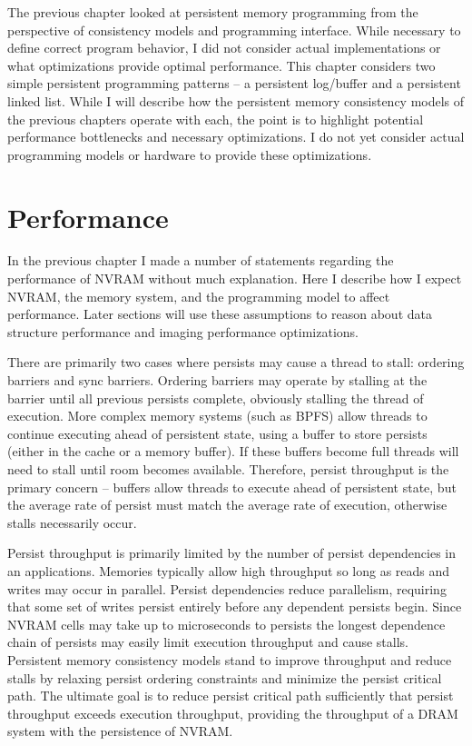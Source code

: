 The previous chapter looked at persistent memory programming from the perspective of consistency models and programming interface.
While necessary to define correct program behavior, I did not consider actual implementations or what optimizations provide optimal performance.
This chapter considers two simple persistent programming patterns -- a persistent log/buffer and a persistent linked list.
While I will describe how the persistent memory consistency models of the previous chapters operate with each, the point is to highlight potential performance bottlenecks and necessary optimizations.
I do not yet consider actual programming models or hardware to provide these optimizations.

\section{Performance}
\label{sec:PMC_patterns:Performance}

In the previous chapter I made a number of statements regarding the performance of NVRAM without much explanation.
Here I describe how I expect NVRAM, the memory system, and the programming model to affect performance.
Later sections will use these assumptions to reason about data structure performance and imaging performance optimizations.

There are primarily two cases where persists may cause a thread to stall: ordering barriers and sync barriers.
Ordering barriers may operate by stalling at the barrier until all previous persists complete, obviously stalling the thread of execution.
More complex memory systems (such as BPFS) allow threads to continue executing ahead of persistent state, using a buffer to store persists (either in the cache or a memory buffer).
If these buffers become full threads will need to stall until room becomes available.
Therefore, persist throughput is the primary concern -- buffers allow threads to execute ahead of persistent state, but the average rate of persist must match the average rate of execution, otherwise stalls necessarily occur.

Persist throughput is primarily limited by the number of persist dependencies in an applications.
Memories typically allow high throughput so long as reads and writes may occur in parallel.
Persist dependencies reduce parallelism, requiring that some set of writes persist entirely before any dependent persists begin.
Since NVRAM cells may take up to microseconds to persists the longest dependence chain of persists may easily limit execution throughput and cause stalls.
Persistent memory consistency models stand to improve throughput and reduce stalls by relaxing persist ordering constraints and minimize the persist critical path.
The ultimate goal is to reduce persist critical path sufficiently that persist throughput exceeds execution throughput, providing the throughput of a DRAM system with the persistence of NVRAM.

